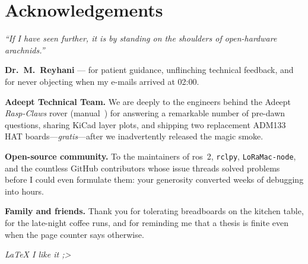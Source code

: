 \chapter*{Acknowledgements}

\begin{flushright}
\textit{“If I have seen further, it is by standing on the shoulders of
open-hardware arachnids.”} %
\end{flushright}

\vspace{1em}

\textbf{Dr.\ M.~Reyhani} — for patient guidance, unflinching
technical feedback, and for never objecting when my e-mails arrived at
02:00.


\medskip
\textbf{Adeept Technical Team.}
We are deeply  to the engineers behind the Adeept
\emph{Rasp-Claws} rover (manual~\cite{adeeptRaspClawsManual})
for answering a remarkable number of pre-dawn questions, sharing KiCad
layer plots, and shipping two replacement ADM133 HAT boards—\emph{gratis}—after we inadvertently released the magic smoke.

\medskip
\textbf{Open-source community.}
To the maintainers of \gls{ros}~2, \texttt{rclpy}, \texttt{LoRaMac-node}, and
the countless GitHub contributors whose issue threads solved problems
before I could even formulate them: your generosity converted weeks of
debugging into hours.


\medskip
\textbf{Family and friends.}
Thank you for tolerating breadboards on the kitchen table, for the
late-night coffee runs, and for reminding me that a thesis is finite
even when the page counter says otherwise.

\medskip
\noindent\textit{\LaTeX{} I like it ;\textgreater}
